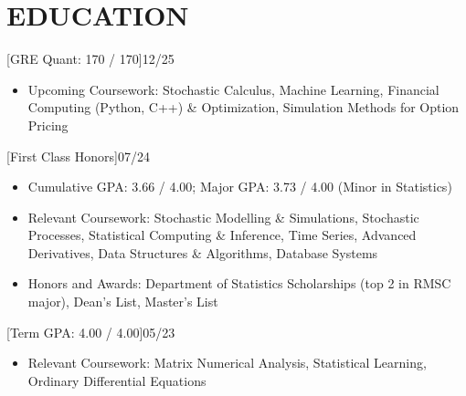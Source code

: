 \documentclass[cmu]{resume}
\begin{document}
    \address{160 Water Street, New York, NY 10038}
    \maketitle
    \section{EDUCATION}
    [GRE Quant: 170 / 170]{12/25}
    \begin{itemize}
        \item Upcoming Coursework: Stochastic Calculus, Machine Learning, Financial Computing (Python, C++) \& Optimization, Simulation Methods for Option Pricing
    \end{itemize}

    [First Class Honors]{07/24}
    \begin{itemize}
        \item Cumulative GPA: 3.66 / 4.00; Major GPA: 3.73 / 4.00 (Minor in Statistics)
        \item Relevant Coursework: Stochastic Modelling \& Simulations, Stochastic Processes, Statistical Computing \& Inference, Time Series, Advanced Derivatives, Data Structures \& Algorithms, Database Systems
        \item Honors and Awards: Department of Statistics Scholarships (top 2 in RMSC major), Dean's List, Master's List
    \end{itemize}

    [Term GPA: 4.00 / 4.00]{05/23}
    \begin{itemize}
        \item Relevant Coursework: Matrix Numerical Analysis, Statistical Learning, Ordinary Differential Equations
    \end{itemize}
\end{document}
